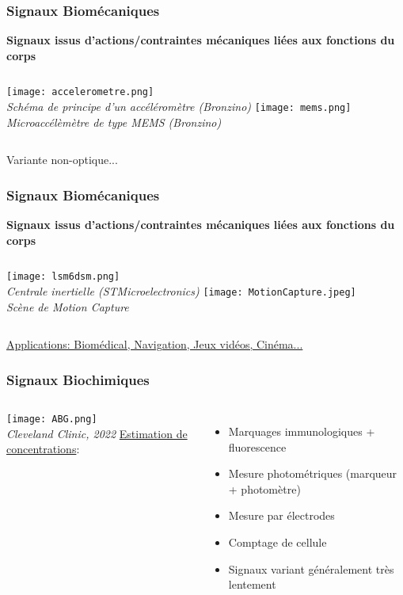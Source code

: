 \documentclass{beamer}
\begin{document}
\begin{frame}
\frametitle{Signaux Biomécaniques}
\textbf{Signaux issus d'actions/contraintes mécaniques liées aux fonctions du corps}
\begin{columns}
\column{60mm}
\texttt{[image: accelerometre.png]}\\
\footnotesize{\textit{Schéma de principe d'un accéléromètre (Bronzino)}}
\column{60mm}
\texttt{[image: mems.png]}\\
\footnotesize{\textit{Microaccélèmètre de type MEMS (Bronzino)}}

\end{columns}
\begin{block}{}
Variante non-optique...
\end{block} 

 \end{frame}

\begin{frame}
\frametitle{Signaux Biomécaniques}
\textbf{Signaux issus d'actions/contraintes mécaniques liées aux fonctions du corps}
\begin{columns}
\column{60mm}
\texttt{[image: lsm6dsm.png]}\\
\footnotesize{\textit{Centrale inertielle (STMicroelectronics)}}
\column{60mm}
\texttt{[image: MotionCapture.jpeg]}\\
\footnotesize{\textit{Scène de Motion Capture}}

\end{columns}
\vspace{0.3cm}
\underline{Applications: Biomédical, Navigation, Jeux vidéos, Cinéma...}
\end{frame}

\begin{frame}
\frametitle{Signaux Biochimiques}
\begin{columns}
\column{60mm}
 \texttt{[image: ABG.png]}\\
 \vspace{0.1cm}
 \textit{Cleveland Clinic, 2022}
\column{60mm}
 \underline{Estimation de concentrations}:
\begin{itemize}
\item Marquages immunologiques + fluorescence
\vspace{0.2cm}
\item Mesure photométriques (marqueur + photomètre)
\vspace{0.2cm}
\item Mesure par électrodes
\vspace{0.2cm}
\item Comptage de cellule 
\vspace{0.2cm}
\item Signaux variant généralement très lentement
\end{itemize}
\end{columns}
\end{frame}
\end{document}
